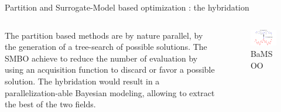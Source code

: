 \begin{frame}{Partition and Surrogate-Model based optimization : the hybridation}

    \begin{columns}
        \begin{column}{0.5\textwidth}
        The partition based methods are by nature parallel, by the generation of a tree-search of possible solutions. The SMBO achieve to reduce the number of evaluation by using an acquisition function to discard or favor a possible solution. The hybridation would result in a parallelization-able Bayesian modeling, allowing to extract the best of the two fields. \\
           
        \end{column}

        \begin{column}{0.5\textwidth}
            \begin{figure}
                \centering
                \includegraphics[width=\linewidth]{imgs/bamsoo.png}
                \caption{BaMSOO \cite{wang2014bamsoo}}
            \end{figure}
        \end{column}
    \end{columns}

\end{frame}



